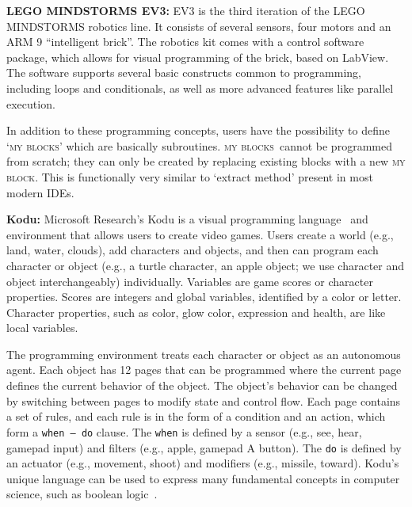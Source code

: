 \documentclass[conference]{IEEEtran}
\newcommand{\ms}{LEGO MINDSTORMS EV3}
\newcommand{\mbs}{\textsc{my blocks}}
\newcommand{\mb}{\textsc{my block}}
\begin{document}
 \textbf{\ms:}
EV3 is the third iteration of the LEGO MINDSTORMS robotics line. It consists of several sensors, four motors and an ARM 9 ``intelligent brick''. The robotics kit comes with a control software package, which allows for visual programming of the brick, based on LabView. The software supports several basic constructs common to programming, including loops and conditionals, as well as more advanced features like parallel execution. 

In addition to these programming concepts, users have the possibility to define `\mbs' which are basically  subroutines. 
\mbs~cannot be programmed from scratch; they can only be created by replacing existing blocks with a new \mb. This is functionally very similar to `extract method' present in most modern IDEs. 



\textbf{Kodu:}
Microsoft Research's Kodu is a visual programming language~\cite{kodugrammar} and environment that allows users to create  video games. 
Users create a world (e.g., land, water, clouds),  add characters and objects, and then can program each character or object (e.g., a turtle character, an apple object; we use character and object interchangeably) individually. Variables are game scores or character properties. Scores are integers and global variables, identified by a color or letter. Character properties, such as color, glow color, expression and health, are like local variables. 

The programming environment treats each character or object as an autonomous agent. 
Each object has 12 pages that can be programmed  where the current page defines the current behavior of the object. 
The object's behavior can be changed by switching between pages to modify state and control flow. 
Each page contains a set of rules, and each rule is in the form of a condition and an action, which form a {\tt when~--~do} clause. 
The {\tt when} is defined by a sensor (e.g., see, hear, gamepad input) and filters (e.g., apple, gamepad A button). The {\tt do} is defined by an actuator (e.g., movement, shoot) and modifiers (e.g., missile, toward). Kodu's unique language  can be used to express many fundamental concepts in computer science, such as  boolean logic~\cite{Stolee:2011:ECS:1953163.1953197}. 
\end{document}
